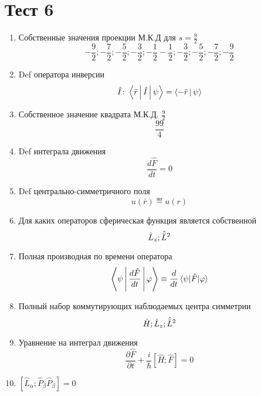 \section{Тест 6}
\begin{enumerate}
    \item Собственные значения проекции М.К.Д для $s=\frac{9}{2}$
        $$-\frac{9}{2};-\frac{7}{2};-\frac{5}{2};-\frac{3}{2};-\frac{1}{2}
        -\frac{1}{2};-\frac{3}{2};-\frac{5}{2};-\frac{7}{2};-\frac{9}{2}$$
    \item Def оператора инверсии
        $$\hat I\colon 
	\Braket{\bar r | \hat I | \psi} = \Braket{-\bar r | \psi}$$
    \item Собственное значение квадрата М.К.Д. $\frac{9}{2}$
        $$\frac{99}{4}$$
    \item Def интеграла движения
        $$\frac{d\hat F}{dt}=0$$
    \item Def центрально-симметричного поля
        $$u(\bar r)\eqdef u(r)$$
    \item Для каких операторов сферическая функция является собственной
        $$\Hat L_z; \Hat{\bar L}^2$$
    \item Полная производная по времени оператора
        $$\Braket{\psi|\frac{d\hat F}{dt}|\varphi}\equiv\frac{d}{dt}\braket{\psi|\hat F|\varphi}$$
    \item Полный набор коммутирующих наблюдаемых центра симметрии
        $$\hat H; \hat L_z; \Hat{\bar L} ^2$$
    \item Уравнение на интеграл движения
        $$\frac{\partial\hat F}{\partial t}+\frac{i}{\hbar}[\hat H;\hat F] = 0$$
    \item $[\hat L_\alpha; \hat P_\beta \hat P_\beta]=0$
\end{enumerate}

